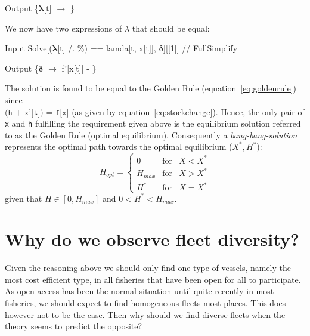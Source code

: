 \documentclass[11pt,fleqn]{book} %
\begin{document}
\begin{theorem}
\begin{mmaCell}{Output}
  \Big\{\(\pmb{\lambda}\)[t] \(\to\) \Big\}
\end{mmaCell}
We now have two expressions of $\lambda$ that should be equal:
\begin{mmaCell}{Input}
  Solve[(\(\pmb{\lambda}\)[t] /. \%) == lamda[t, x[t]], \(\pmb{\delta}\)][[1]] // FullSimplify 
\end{mmaCell}
\begin{mmaCell}{Output}
  \Big\{\(\pmb{\delta}\) \(\to\) f'[x[t]] - \Big\}
\end{mmaCell}
The solution is found to be equal to the Golden Rule (equation~\ref{eq:goldenrule}) since \\
$\texttt{(h + x'[t]) = f[x]}$ (as given by equation~\ref{eq:stockchange}). Hence, the only pair of \texttt{x} and \texttt{h} fulfilling the requirement given above is the equilibrium solution referred to as the Golden Rule (optimal equilibrium). Consequently a \textit{bang-bang-solution} represents the optimal path towards the optimal equilibrium ($X^*, H^*$):
\begin{equation*} 
H_{opt} = \left\{ \begin{array}{lcl}
0       & \mbox{for} & X < X^* \\ 
H_{max} & \mbox{for} & X > X^* \\
H^*     & \mbox{for} & X = X^*
\end{array}\right.
\end{equation*}
given that $H \in [0, H_{max}]$ and $0 < H^* < H_{max}$.
\label{code:maximumprinciple}
\end{theorem}
\section{Why do we observe fleet diversity?}

Given the reasoning above we should only find one type of vessels, namely the most cost efficient type, in all fisheries that have been open for all to participate. As open access has been the normal situation until quite recently in most fisheries, we should expect to find homogeneous fleets most places. This does however not to be the case. Then why should we find diverse fleets when the theory seems to predict the opposite?
\end{document}
